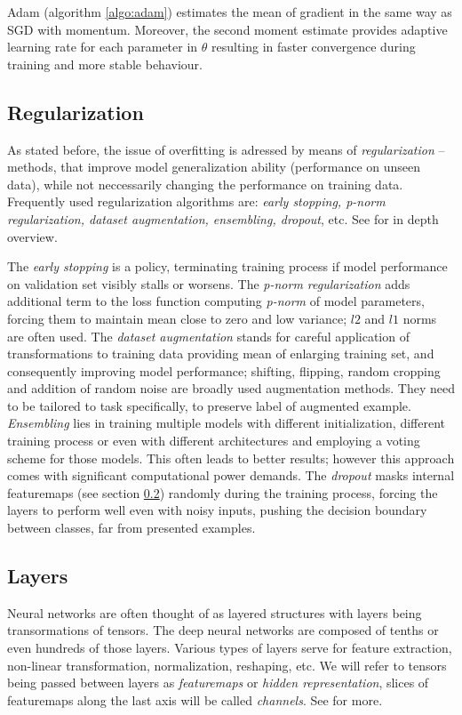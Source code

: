 Adam (algorithm \ref{algo:adam}) estimates the mean of gradient in the same way as SGD with momentum. Moreover, the second moment estimate provides adaptive learning rate for each parameter in $\theta$ resulting in faster convergence during training and more stable behaviour.

\subsection{Regularization}
\label{sec:regularization}

As stated before, the issue of overfitting is adressed by means of \emph{regularization} -- methods, that improve model generalization ability (performance on unseen data), while not neccessarily changing the performance on training data. Frequently used regularization algorithms are: \emph{early stopping, p-norm regularization, dataset augmentation, ensembling, dropout}, etc. See \cite{Goodfellow-et-al-2016} for in depth overview.

The \emph{early stopping} is a policy, terminating training process if model performance on validation set visibly stalls or worsens. The \emph{p-norm regularization} adds additional term to the loss function computing \emph{p-norm} of model parameters, forcing them to maintain mean close to zero and low variance; $l2$ and $l1$ norms are often used. The \emph{dataset augmentation} stands for careful application of transformations to training data providing mean of enlarging training set, and consequently improving model performance; shifting, flipping, random cropping and addition of random noise are broadly used augmentation methods. They need to be tailored to task specifically, to preserve label of augmented example. \emph{Ensembling} lies in training multiple models with different initialization, different training process or even with different architectures and employing a voting scheme for those models. This often leads to better results; however this approach comes with significant computational power demands. The \emph{dropout} masks internal featuremaps (see section \ref{sec:layers}) randomly during the training process, forcing the layers to perform well even with noisy inputs, pushing the decision boundary between classes, far from presented examples.

\subsection{Layers}
\label{sec:layers}
Neural networks are often thought of as layered structures with layers being transormations of tensors. The deep neural networks are composed of tenths or even hundreds of those layers. Various types of layers serve for feature extraction, non-linear transformation, normalization, reshaping, etc. We will refer to tensors being passed between layers as \emph{featuremaps} or \emph{hidden representation}, slices of featuremaps along the last axis will be called \emph{channels}. See \cite{Goodfellow-et-al-2016} for more.

